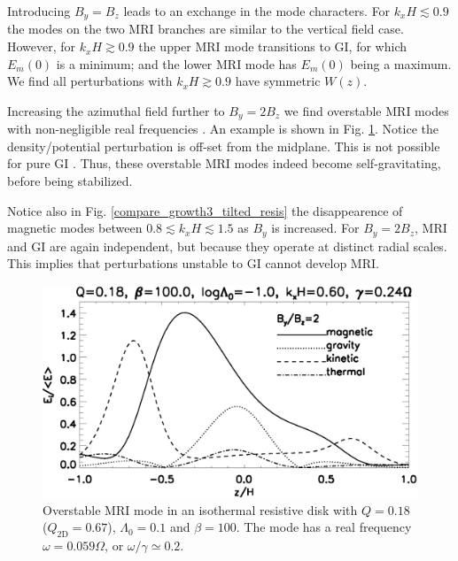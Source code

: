 Introducing $B_y = B_z$ leads to an exchange in the mode
characters. For $k_xH\lesssim 0.9$ the modes on the two MRI branches
are similar to the vertical field case. However, for $k_xH\gtrsim0.9$ 
the upper MRI mode transitions to GI, for which $E_m(0)$ is a
minimum; and the lower MRI mode has $E_m(0)$ being a maximum. We find
all perturbations with  $k_xH\gtrsim0.9$ have symmetric $W(z)$. 


Increasing the azimuthal field further to $B_y=2B_z$ we find
overstable MRI modes  with non-negligible real
frequencies \citep{gammie96}. An example is shown in
Fig. \ref{result_tilted_overstable}. Notice the density/potential
perturbation is off-set from the midplane. This is not possible for
pure GI \citep{goldreich65a}. Thus, these overstable MRI modes indeed
become self-gravitating, before being stabilized. 

Notice also in Fig. \ref{compare_growth3_tilted_resis} the disappearence of
magnetic modes between $0.8\lesssim k_xH\lesssim 1.5$ as $B_y$ is
increased. For $B_y=2B_z$, MRI and GI are again independent, but
because they operate at distinct radial scales. This implies that
perturbations unstable to GI cannot develop MRI.       


\begin{figure}
  \includegraphics[width=\linewidth,clip=true,trim=0cm 0cm 0cm
    0cm]{figures/result_tilted_resis.ps}
  \caption{Overstable MRI mode in an isothermal resistive disk with
    $Q=0.18$ ($Q_\mathrm{2D} = 0.67$), $\Lambda_0=0.1$ and $\beta=100$. 
    The mode has a real frequency $\omega = 0.059\Omega$, or
    $\omega/\gamma \simeq 0.2 $.   
    \label{result_tilted_overstable}}
\end{figure}
